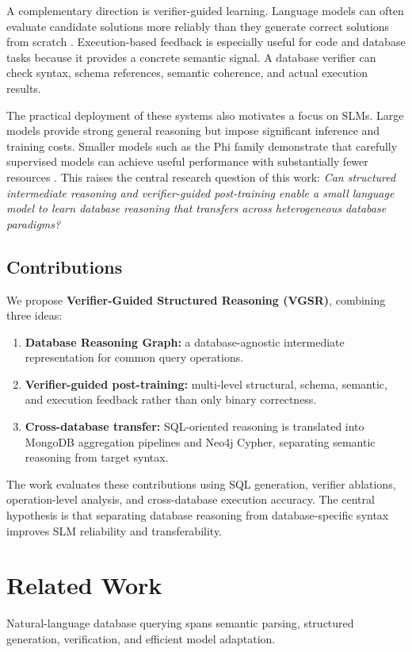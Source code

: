 \documentclass[conference]{IEEEtran}
\begin{document}
A complementary direction is verifier-guided learning. Language models can often evaluate candidate solutions more reliably than they generate correct solutions from scratch \cite{b13,b14,b15}. Execution-based feedback is especially useful for code and database tasks because it provides a concrete semantic signal. A database verifier can check syntax, schema references, semantic coherence, and actual execution results.

The practical deployment of these systems also motivates a focus on SLMs. Large models provide strong general reasoning but impose significant inference and training costs. Smaller models such as the Phi family demonstrate that carefully supervised models can achieve useful performance with substantially fewer resources \cite{b7,b19,b20}. This raises the central research question of this work: \emph{Can structured intermediate reasoning and verifier-guided post-training enable a small language model to learn database reasoning that transfers across heterogeneous database paradigms?}

\subsection{Contributions}
We propose \textbf{Verifier-Guided Structured Reasoning (VGSR)}, combining three ideas:
\begin{enumerate}
\item \textbf{Database Reasoning Graph:} a database-agnostic intermediate representation for common query operations.
\item \textbf{Verifier-guided post-training:} multi-level structural, schema, semantic, and execution feedback rather than only binary correctness.
\item \textbf{Cross-database transfer:} SQL-oriented reasoning is translated into MongoDB aggregation pipelines and Neo4j Cypher, separating semantic reasoning from target syntax.
\end{enumerate}

The work evaluates these contributions using SQL generation, verifier ablations, operation-level analysis, and cross-database execution accuracy. The central hypothesis is that separating database reasoning from database-specific syntax improves SLM reliability and transferability.

\section{Related Work}
\label{sec:related}
Natural-language database querying spans semantic parsing, structured generation, verification, and efficient model adaptation.
\end{document}
